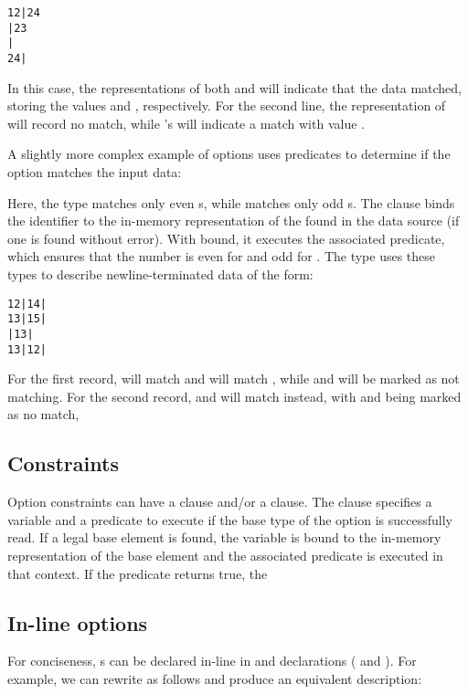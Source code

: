 \begin{verbatim}
12|24
|23
|
24|
\end{verbatim}
\noindent
In this case, the representations of both  and  will
indicate that the data matched, storing the values  and
, respectively.  For the second line, the representation of
 will record no match, while 's will indicate a match with
value . 

A slightly more complex example of options uses predicates to
determine if the option matches the input data:


\noindent
Here, the type  matches only even s, while
 matches only odd s.  The \Psome{} clause binds
the identifier  to the in-memory representation of the
 found in the data source (if one is found without
error).  With  bound, it executes the associated predicate,
which ensures that the number is even for  and odd for
. 
The type  uses
these types to describe newline-terminated data of the form:
\begin{verbatim}
12|14|
13|15|
|13|
13|12|
\end{verbatim}
For the first record,  will match  and  will
match , while  and  will be marked as not
matching. For the second record,  and  will match 
instead, with  and  being marked as no match, \etc{}


\subsection{Constraints}
\label{sec:opt-constraints}
Option constraints can have a \Psome{} clause and/or a \Pnone{}
clause.  The \Psome{} clause specifies a variable and a predicate to
execute if the base type of the option is successfully read.  If a
legal base element is found, the variable is bound to the in-memory
representation of the base element and the associated predicate is
executed in that context.  If the predicate returns true, the

\subsection{In-line options}
For conciseness, \Popt{}s can be declared in-line in \Pstruct{} and \Punion{}
declarations (\cf{}  and
).  For example,  we can rewrite 
 as follows and produce an equivalent description:


